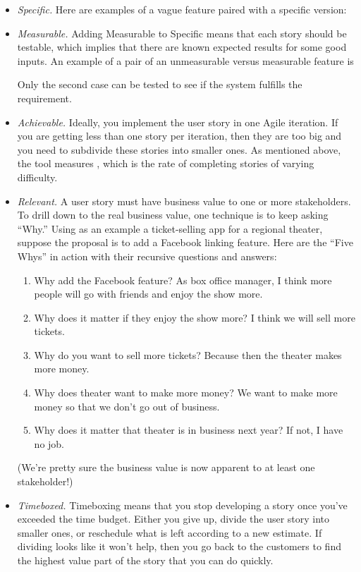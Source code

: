 \begin{itemize}
\item \emph{Specific.}
Here are examples of a vague feature paired with a specific version:


\item \emph{Measurable.}
Adding Measurable to Specific means that each story should be testable, which implies that there are known expected results for some good inputs.
An example of a pair of an unmeasurable versus measurable feature is

Only the second case can be tested to see if the system fulfills the requirement.

\item \emph{Achievable.}
\tool
Ideally, you implement the user story in one Agile iteration. If you are getting less than one story per iteration, then they are too big and you need to subdivide these stories into smaller ones.
As mentioned above, the tool  measures , which is the rate of completing stories  of varying difficulty.
\item \emph{Relevant.}
A user story must have business value to one or more stakeholders. To
drill down to the real business value, one technique is to keep asking
``Why.'' Using as an example a ticket-selling app for a regional
theater, suppose the proposal is to add a Facebook linking feature.
Here are the ``Five Whys'' in action with their recursive questions and
answers:

\begin{enumerate}
	\item Why add the Facebook feature? As box office manager, I think more people will go with friends and enjoy the show more.
	\item Why does it matter if they enjoy the show more? I think we will sell more tickets.
	\item Why do you want to sell more tickets? Because then the theater makes more money.
	\item Why does theater want to make more money? We want to make more money so that we don't go out of business.
	\item Why does it matter that theater is in business next year? If not, I have no job.
\end{enumerate}
(We're pretty sure the business value is now apparent to at least one stakeholder!)
\item \emph{Timeboxed.}
Timeboxing means that you stop developing a story once you've exceeded the time budget. Either you give up, divide the user story into smaller ones, or reschedule what is left according to a new estimate.
If dividing looks like it won't help, then you go back to the customers to find the highest value part of the story that you can do quickly.


\end{itemize}
